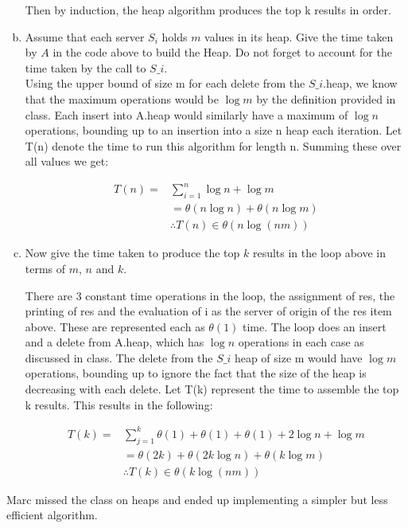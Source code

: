\documentclass[12pt]{article}
\begin{document}
\begin{enumerate}[(a)]
Then by induction, the heap algorithm produces the top k results in order.

\item Assume that each server $S_i$ holds $m$ values in its heap. Give the time taken
by $A$ in the code above to build the Heap. Do not forget to account for the time
taken by the call to $S\_i$.\\

Using the upper bound of size m for each delete from the $S\_i$.heap, we know  that the maximum operations would be $\log m$ by the definition provided in class. Each insert into A.heap would similarly have a maximum of $\log n$ operations, bounding up to an insertion into a size n heap each iteration. Let T(n) denote the time to run this algorithm for length n. Summing these over all values we get:

\begin{align*}
  T(n)=&\sum_{i=1}^n \log n + \log m\\
  &=\theta(n\log n) + \theta(n\log m)\\
  &\therefore T(n) \in \theta(n \log(nm))
\end{align*}

\item  Now give the time taken
to produce the top $k$ results in the loop above in terms of $m$, $n$ and $k$.

There are 3 constant time operations in the loop, the assignment of res, the printing of res and the evaluation of i
as the server of origin of the res item above. These are represented each as $\theta(1)$ time. The loop does an insert and a delete from A.heap, which has $\log n$ operations in each case as discussed in class. The delete from the $S\_i$ heap of size m would have $\log m$ operations, bounding up to ignore the fact that the size of the heap is decreasing with each delete. Let T(k) represent the time to assemble the top k results. This results in the following:

\begin{align*}
  T(k)=&\sum_{j=1}^k \theta(1) + \theta(1) + \theta(1) + 2\log n + \log m\\
  &= \theta(2k) + \theta(2k\log n) + \theta(k\log m)\\
  &\therefore T(k) \in \theta(k\log (nm))
\end{align*}
\setcounter{saveenum}{\value{enumi}}
\end{enumerate}
Marc missed the class on heaps and ended up implementing a simpler but less efficient
algorithm.
\end{document}
